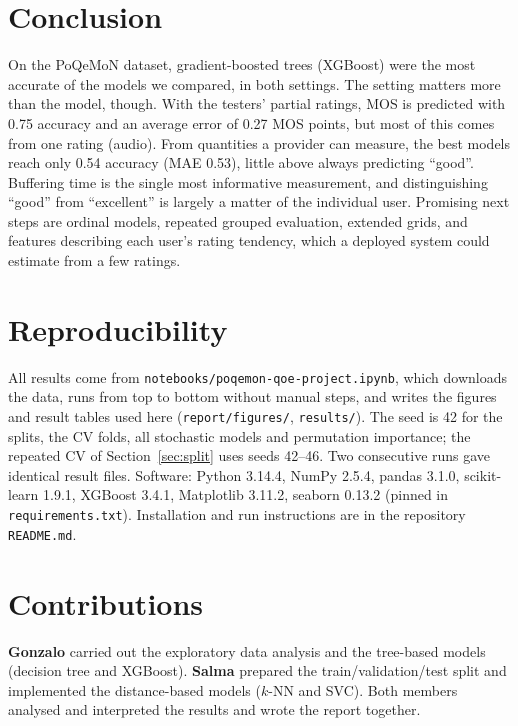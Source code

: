 \documentclass[11pt,a4paper]{article}
\newcommand{\code}[1]{\texttt{#1}}
\begin{document}
\section{Conclusion}
On the PoQeMoN dataset, gradient-boosted trees (XGBoost) were the most accurate of the models we compared,
in both settings. The setting matters more than the model, though. With the testers' partial ratings, MOS
is predicted with 0.75 accuracy and an average error of 0.27 MOS points, but most of this comes from one
rating (audio). From quantities a provider can measure, the best models reach only 0.54 accuracy (MAE 0.53),
little above always predicting ``good''. Buffering time is the single most informative measurement, and
distinguishing ``good'' from ``excellent'' is largely a matter of the individual user. Promising next steps
are ordinal models, repeated grouped evaluation, extended grids, and features describing each
user's rating tendency, which a deployed system could estimate from a few ratings.

\section*{Reproducibility}
All results come from \code{notebooks/poqemon-qoe-project.ipynb}, which downloads the data, runs from top to
bottom without manual steps, and writes the figures and result tables used here (\code{report/figures/},
\code{results/}). The seed is 42 for the splits, the CV folds, all stochastic models and permutation
importance; the repeated CV of Section~\ref{sec:split} uses seeds 42--46. Two consecutive runs gave
identical result files. Software: Python 3.14.4, NumPy 2.5.4, pandas 3.1.0, scikit-learn 1.9.1,
XGBoost 3.4.1, Matplotlib 3.11.2, seaborn 0.13.2 (pinned in \code{requirements.txt}). Installation and
run instructions are in the repository \code{README.md}.

\section*{Contributions}
\textbf{Gonzalo} carried out the exploratory data analysis and the tree-based models (decision tree and
XGBoost). \textbf{Salma} prepared the train/validation/test split and implemented the distance-based models
($k$-NN and SVC). Both members analysed and interpreted the results and wrote the report together.
\end{document}
